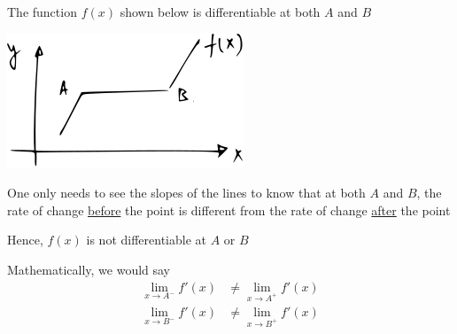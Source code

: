\documentclass[14pt,fleqn]{extarticle}
\begin{document}
 
\begin{snippet}
    
    \incorrect
    
    The function $f(x)$ shown below is differentiable at both $A$ and $B$ 
    
    \begin{center}
\includegraphics[scale=1.5]{figure.svg}
\end{center}
    
    \reason
    
    One only needs to see the slopes of the lines to know that at both $A$ and $B$, the rate of change \underline{before} the point 
    is different from the rate of change \underline{after} the point\newline 
    
    Hence, $f(x)$ is not differentiable at $A$ or $B$ \newline 
    
    Mathematically, we would say 
    \begin{align}
	\lim_{x\to A^-} f'(x) &\neq \lim_{x\to A^+} f'(x) \\
	\lim_{x\to B^-} f'(x) &\neq \lim_{x\to B^+} f'(x) 
\end{align}
\end{snippet} 
\end{document}
